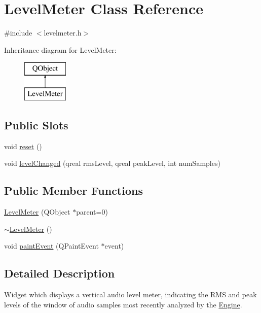 \hypertarget{class_level_meter}{}\section{Level\+Meter Class Reference}
\label{class_level_meter}


{\ttfamily \#include $<$levelmeter.\+h$>$}

Inheritance diagram for Level\+Meter\+:\begin{figure}[H]
\begin{center}
\leavevmode
\includegraphics[height=2.000000cm]{class_level_meter}
\end{center}
\end{figure}
\subsection*{Public Slots}
\begin{DoxyCompactItemize}
\item 
void \hyperlink{class_level_meter_a53a108a6b5a8c73198c11d50173c3505}{reset} ()
\item 
void \hyperlink{class_level_meter_a5aabf54c24c8651ea834b4e8f404d5e4}{level\+Changed} (qreal rms\+Level, qreal peak\+Level, int num\+Samples)
\end{DoxyCompactItemize}
\subsection*{Public Member Functions}
\begin{DoxyCompactItemize}
\item 
\hyperlink{class_level_meter_addf17c9ccc12cfab6389a5170c5f9a49}{Level\+Meter} (Q\+Object $\ast$parent=0)
\item 
\hyperlink{class_level_meter_a28a42090bec996fdda8e804828b49b4c}{$\sim$\+Level\+Meter} ()
\item 
void \hyperlink{class_level_meter_a30abecefda651adad386ab6a643a7295}{paint\+Event} (Q\+Paint\+Event $\ast$event)
\end{DoxyCompactItemize}


\subsection{Detailed Description}
Widget which displays a vertical audio level meter, indicating the R\+MS and peak levels of the window of audio samples most recently analyzed by the \hyperlink{class_engine}{Engine}. 

